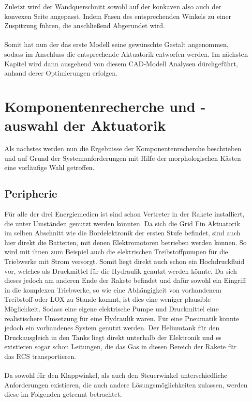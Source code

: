 Zuletzt wird der Wandquerschnitt sowohl auf der konkaven also auch der konvexen Seite angepasst. Indem Fasen des entsprechenden Winkels zu einer Zuspitzung führen, die anschließend Abgerundet wird.
\\~\\
Somit hat nun der das erste Modell seine gewünschte Gestalt angenommen, sodass im Anschluss die entsprechende Aktuatorik entworfen werden. Im nächsten Kapitel wird dann ausgehend von diesem CAD-Modell Analysen dürchgeführt, anhand derer Optimierungen erfolgen. 
\section{Komponentenrecherche und -auswahl der Aktuatorik}
Als nächstes werden nun die Ergebnisse der Komponentenrecherche beschrieben und auf Grund der Systemanforderungen mit Hilfe der morphologischen Kästen eine vorläufige Wahl getroffen.
\subsection{Peripherie}
Für alle der drei Energiemedien ist sind schon Vertreter in der Rakete installiert, die unter Umständen genutzt werden könnten. Da sich die Grid Fin Aktuatorik im selben Abschnitt wie die Bordelektronik der ersten Stufe befindet, sind auch hier direkt die Batterien, mit denen Elektromotoren betrieben werden können. So wird mit ihnen zum Beispiel auch die elektrischen Treibstoffpumpen für die Triebwerke mit Strom versorgt. Somit liegt direkt auch schon ein Hochdruckfluid vor, welches als Druckmittel für die Hydraulik genutzt werden könnte. Da sich dieses jedoch am anderen Ende der Rakete befindet und dafür sowohl ein Eingriff in die komplexen Triebwerke, so wie eine Abhängigkeit von vorhandenem Treibstoff oder LOX zu Stande kommt, ist dies eine weniger plausible Möglichkeit. Sodass eine eigene elektrische Pumpe und Druckmittel eine realistischere Umsetzung für eine Hydraulik wären. Für eine Pneumatik könnte jedoch ein vorhandenes System genutzt werden. Der Heliumtank für den Druckausgleich in den Tanks liegt direkt unterhalb der Elektronik und es existieren sogar schon Leitungen, die das Gas in diesen Bereich der Rakete für das RCS transportieren.
\\~\\
Da sowohl für den Klappwinkel, als auch den Steuerwinkel unterschiedliche Anforderungen existieren, die auch andere Lösungsmöglichkeiten zulassen, werden diese im Folgenden getrennt betrachtet.
